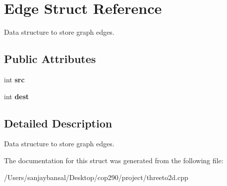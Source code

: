 \hypertarget{struct_edge}{}\section{Edge Struct Reference}
\label{struct_edge}


Data structure to store graph edges.  


\subsection*{Public Attributes}
\begin{DoxyCompactItemize}
\item 
\mbox{\label{struct_edge_a9a415f211c059647d1b3af8fcf7a0e30}} 
int {\bfseries src}
\item 
\mbox{\label{struct_edge_ad7df434ff7710e69f28bb31e91a35f82}} 
int {\bfseries dest}
\end{DoxyCompactItemize}


\subsection{Detailed Description}
Data structure to store graph edges. 

The documentation for this struct was generated from the following file\+:\begin{DoxyCompactItemize}
\item 
/\+Users/sanjaybansal/\+Desktop/cop290/project/threeto2d.\+cpp\end{DoxyCompactItemize}
